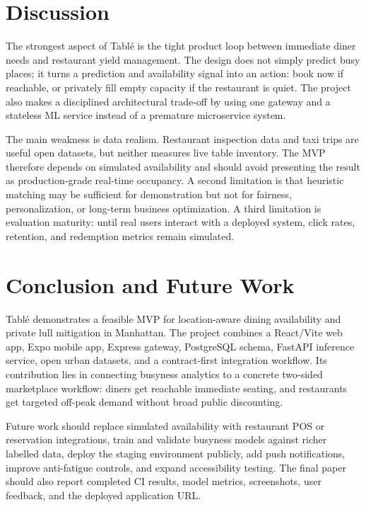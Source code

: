 \documentclass[conference]{IEEEtran}
\begin{document}
\section{Discussion}
The strongest aspect of Tabl\'e is the tight product loop between immediate diner needs and restaurant yield management. The design does not simply predict busy places; it turns a prediction and availability signal into an action: book now if reachable, or privately fill empty capacity if the restaurant is quiet. The project also makes a disciplined architectural trade-off by using one gateway and a stateless ML service instead of a premature microservice system.

The main weakness is data realism. Restaurant inspection data and taxi trips are useful open datasets, but neither measures live table inventory. The MVP therefore depends on simulated availability and should avoid presenting the result as production-grade real-time occupancy. A second limitation is that heuristic matching may be sufficient for demonstration but not for fairness, personalization, or long-term business optimization. A third limitation is evaluation maturity: until real users interact with a deployed system, click rates, retention, and redemption metrics remain simulated.

\section{Conclusion and Future Work}
Tabl\'e demonstrates a feasible MVP for location-aware dining availability and private lull mitigation in Manhattan. The project combines a React/Vite web app, Expo mobile app, Express gateway, PostgreSQL schema, FastAPI inference service, open urban datasets, and a contract-first integration workflow. Its contribution lies in connecting busyness analytics to a concrete two-sided marketplace workflow: diners get reachable immediate seating, and restaurants get targeted off-peak demand without broad public discounting.

Future work should replace simulated availability with restaurant POS or reservation integrations, train and validate busyness models against richer labelled data, deploy the staging environment publicly, add push notifications, improve anti-fatigue controls, and expand accessibility testing. The final paper should also report completed CI results, model metrics, screenshots, user feedback, and the deployed application URL.
\end{document}
